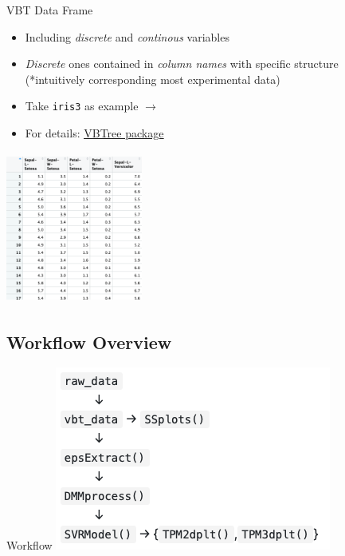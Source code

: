 \documentclass[11pt]{beamer}
\newcommand{\code}[1]{\texttt{#1}}
\begin{document}
\begin{frame}{VBT Data Frame}
    \begin{minipage}[t]{0.5\textwidth}
        \vspace{0pt}
        \begin{itemize}
            \item Including \emph{discrete} and \emph{continous} variables
            \item \emph{\color{red}Discrete} ones contained in \emph{\color{red}column names} with specific structure \\ {\footnotesize\color{olive}(*intuitively corresponding most experimental data)}
            \item Take \code{iris3} as example $\rightarrow$
            \item For details: \href{https://CRAN.R-project.org/package=VBTree}{\color{cyan}\underline{VBTree package}}
        \end{itemize}
    \end{minipage}%
    \hfill
    \begin{minipage}[t]{0.45\textwidth}
        \vspace{0pt}
        \centering
              \includegraphics[height=5cm, width=4.5cm]{Fig2.png}
    \end{minipage}
\end{frame}

\subsection{Workflow Overview}
\begin{frame}{Workflow}
\centering
	\includegraphics[scale=0.6]{Fig3.png}
\end{frame}
\end{document}
